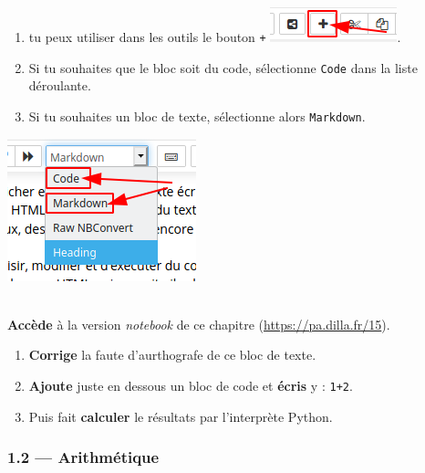 \documentclass[a4paper,17pt]{extarticle}
\newenvironment{eleve}%
{\begin{activite}\color{noiramu}\\[-0.5cm]}
{\end{activite}}
\providecommand{\tightlist}{%
      \setlength{\itemsep}{0pt}\setlength{\parskip}{0pt}}
\begin{document}
\begin{enumerate}
\def\labelenumi{\arabic{enumi}.}
\tightlist
\item
  tu peux utiliser dans les outils le bouton \texttt{+}
  \includegraphics{res/tuto-01.png}.
\item
  Si tu souhaites que le bloc soit du code, sélectionne \texttt{Code}
  dans la liste déroulante.
\item
  Si tu souhaites un bloc de texte, sélectionne alors \texttt{Markdown}.
\end{enumerate}

\includegraphics{res/tuto-02.png}
\begin{eleve}
    \textbf{Accède} à la version \emph{notebook} de ce chapitre
(\url{https://pa.dilla.fr/15}).

\begin{enumerate}
\def\labelenumi{\arabic{enumi}.}
\tightlist
\item
  \textbf{Corrige} la faute d'aurthografe de ce bloc de texte.
\item
  \textbf{Ajoute} juste en dessous un bloc de code et \textbf{écris} y :
  \texttt{1+2}.
\item
  Puis fait \textbf{calculer} le résultats par l'interprète Python.
\end{enumerate}
        
        \end{eleve}
    \hypertarget{arithmuxe9tique}{%
\subsubsection{1.2 --- Arithmétique}\label{arithmuxe9tique}}
\end{document}
